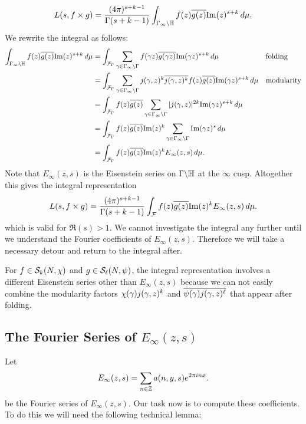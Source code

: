       \[
        L(s,f \times g) = \frac{(4\pi)^{s+k-1}}{\Gamma(s+k-1)}\int_{\Gamma_{\infty}\backslash\mathbb{H}}f(z)\overline{g(z)}\mathrm{Im}(z)^{s+k}\,d\mu.
      \]
      We rewrite the integral as follows:
      \begin{align*}
        \int_{\Gamma_{\infty}\backslash\mathbb{H}}f(z)\overline{g(z)}\mathrm{Im}(z)^{s+k}\,d\mu &= \int_{\mathcal{F}_{\Gamma}}\sum_{\gamma \in \Gamma_{\infty}\backslash\Gamma}f(\gamma z)\overline{g(\gamma z)}\mathrm{Im}(\gamma z)^{s+k}\,d\mu && \text{folding} \\
        &= \int_{\mathcal{F}_{\Gamma}}\sum_{\gamma \in \Gamma_{\infty}\backslash\Gamma}j(\gamma,z)^{k}\overline{j(\gamma,z)^{k}}f(z)\overline{g(z)}\mathrm{Im}(\gamma z)^{s+k}\,d\mu && \text{modularity} \\
        &= \int_{\mathcal{F}_{\Gamma}}f(z)\overline{g(z)}\sum_{\gamma \in \Gamma_{\infty}\backslash\Gamma}|j(\gamma,z)|^{2k}\mathrm{Im}(\gamma z)^{s+k}\,d\mu \\
        &= \int_{\mathcal{F}_{\Gamma}}f(z)\overline{g(z)}\mathrm{Im}(z)^{k}\sum_{\gamma \in \Gamma_{\infty}\backslash\Gamma}\mathrm{Im}(\gamma z)^{s}\,d\mu \\
        &= \int_{\mathcal{F}_{\Gamma}}f(z)\overline{g(z)}\mathrm{Im}(z)^{k}E_{\infty}(z,s)\,d\mu.
      \end{align*}
      Note that $E_{\infty}(z,s)$ is the Eisenstein series on $\Gamma\backslash\mathbb{H}$ at the $\infty$ cusp. Altogether this gives the integral representation
      \begin{equation}\label{equ:Rankin-Selberg_integral-reresentation}
        L(s,f \times g) =  \frac{(4\pi)^{s+k-1}}{\Gamma(s+k-1)}\int_{\mathcal{F}}f(z)\overline{g(z)}\mathrm{Im}(z)^{k}E_{\infty}(z,s)\,d\mu.
      \end{equation}
      which is valid for $\Re(s) > 1$. We cannot investigate the integral any further until we understand the Fourier coefficients of $E_{\infty}(z,s)$. Therefore we will take a necessary detour and return to the integral after.

      \begin{remark}
        For $f \in \mathcal{S}_{k}(N,\chi)$ and $g \in \mathcal{S}_{\ell}(N,\psi)$, the integral representation involves a different Eisenstein series other than $E_{\infty}(z,s)$ because we can not easily combine the modularity factors $\chi(\gamma)j(\gamma,z)^{k}$ and $\overline{\psi(\gamma)j(\gamma,z)^{\ell}}$ that appear after folding.
      \end{remark}
    \subsection*{The Fourier Series of \texorpdfstring{$E_{\infty}(z,s)$}{E_{\infty}(z,s)}}
      Let
      \[
        E_{\infty}(z,s) = \sum_{n \in \mathbb{Z}}a(n,y,s)e^{2\pi inx}.
      \]
      be the Fourier series of $E_{\infty}(z,s)$. Our task now is to compute these coefficients. To do this we will need the following technical lemma:

